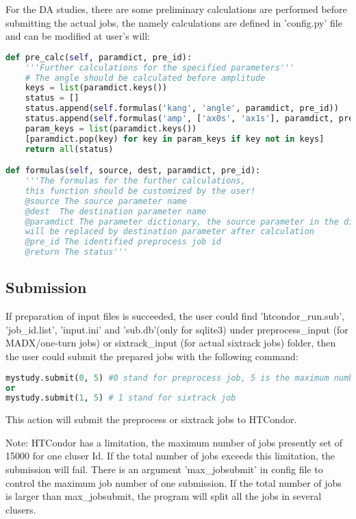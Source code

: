 For the DA studies, there are some preliminary calculations are performed  before submitting the actual jobs, the namely calculations are defined in 'config.py' file and can be modified at user's will:
\begin{lstlisting}[language=Python]
def pre_calc(self, paramdict, pre_id):
    '''Further calculations for the specified parameters'''
    # The angle should be calculated before amplitude
    keys = list(paramdict.keys())
    status = []
    status.append(self.formulas('kang', 'angle', paramdict, pre_id))
    status.append(self.formulas('amp', ['ax0s', 'ax1s'], paramdict, pre_id))
    param_keys = list(paramdict.keys())
    [paramdict.pop(key) for key in param_keys if key not in keys]
    return all(status)

def formulas(self, source, dest, paramdict, pre_id):
    '''The formulas for the further calculations,
    this function should be customized by the user!
    @source The source parameter name
    @dest  The destination parameter name
    @paramdict The parameter dictionary, the source parameter in the dict
    will be replaced by destination parameter after calculation
    @pre_id The identified preprocess job id
    @return The status'''
\end{lstlisting}

\subsection{Submission}
If preparation of input files is succeeded, the user could find 'htcondor\_run.sub', 'job\_id.list', 'input.ini' and 'sub.db'(only for sqlite3) under preprocess\_input (for MADX/one-turn jobs) or sixtrack\_input (for actual sixtrack jobs) folder, then the user could submit the prepared jobs with the following command:
\begin{lstlisting}[language=Python]
mystudy.submit(0, 5) #0 stand for preprocess job, 5 is the maximum number of trials
or
mystudy.submit(1, 5) # 1 stand for sixtrack job
\end{lstlisting}
This action will submit the preprocess or sixtrack jobs to HTCondor.

Note: HTCondor has a limitation, the maximum number of jobs presently set of 15000 for one cluser Id. If the total number of jobs exceeds this limitation, the submission will fail. There is an argument 'max\_jobsubmit' in config file to control the maximum job number of one submission. If the total number of jobs is larger than max\_jobsubmit, the program will split all the jobs in several clusers.

